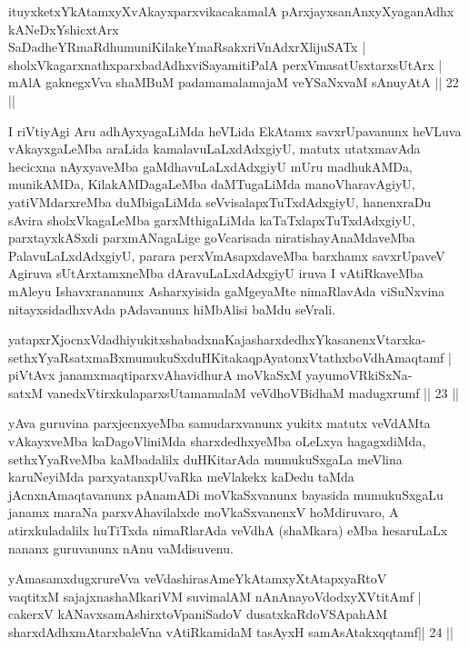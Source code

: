 \begin{shl}
ituyxketxYkAtamxyXvAkayxparxvikacakamalA pArxjayxsanAnxyXyaganAdhx \\
kANeDxYshicxtArx SaDadheYRmaRdhumuniKilakeYmaRsakxriVnAdxrXlijuSATx | \\
sholxVkagarxnathxparxbadAdhx\s viSayamitiPalA perxVmasatUsxtarxsUtArx | \\
mAlA gaknegxVva shaMBuM padamamalamajaM veYSaNxvaM sA\s nuyAtA \hfill||  22 ||  
\end{shl}

\begin{artha}
I riVtiyAgi Aru adhAyxyagaLiMda heVLida EkAtamx savxrUpavanunx heVLuva 
vAkayxgaLeMba araLida kamalavuLaLxdAdxgiyU, matutx utatxmavAda 
hecicxna nAyxyaveMba gaMdhavuLaLxdAdxgiyU mUru madhukAMDa, munikAMDa, 
KilakAMDagaLeMba daMTugaLiMda manoVharavAgiyU, yatiVMdarxreMba 
duMbigaLiMda seVvisalapxTuTxdAdxgiyU, hanenxraDu sAvira 
sholxVkagaLeMba garxMthigaLiMda kaTaTxlapxTuTxdAdxgiyU, parxtayxkASxdi 
parxmANagaLige goVcarisada niratishayAnaMdaveMba PalavuLaLxdAdxgiyU, 
parara perxVmAsapxdaveMba barxhamx savxrUpaveV Agiruva sUtArxtamxneMba 
dAravuLaLxdAdxgiyU iruva I vAtiRkaveMba mAleyu Ishavxrananunx 
Asharxyisida gaMgeyaMte nimaRlavAda viSuNxvina nitayxsidadhxvAda 
pAdavanunx hiMbAlisi baMdu seVrali.
\end{artha}

\begin{shl}
yatapxrXjocnxVdadhiyukitxshabadxnaKajasharxdedhxYkasanenxVtarxka-\\
sethxYyaRsatxmaBxmumukuSxduHKitakaqpAyatonxVtathxboVdhAmaqtamf | \\
piVtAvx janamxmaqtiparxvAhavidhurA moVkaSxM yayumoVRkiSxNa-\\
satxM vanedxV\s tirxkulaparxsUtamamalaM veVdhoVBidhaM madugxrumf \hfill||  23 ||  
\end{shl}

\begin{artha}
yAva guruvina parxjecnxyeMba samudarxvanunx yukitx matutx veVdAMta 
vAkayxveMba kaDagoVliniMda sharxdedhxyeMba oLeLxya hagagxdiMda, 
sethxYyaRveMba kaMbadalilx duHKitarAda mumukuSxgaLa meVlina 
karuNeyiMda parxyatanxpUvaRka meVlakekx kaDedu taMda 
jAcnxnAmaqtavanunx pAnamADi moVkaSxvanunx bayasida mumukuSxgaLu janamx 
maraNa parxvAhavilalxde moVkaSxvanenxV hoMdiruvaro, A atirxkuladalilx 
huTiTxda nimaRlarAda veVdhA (shaMkara) eMba hesaruLaLx nananx 
guruvanunx nAnu vaMdisuvenu.
\end{artha}

\begin{shl}
yAmasamxdugxrureVva veVdashirasAmeYkAtamxyXtAtapxyaRtoV \\
vaqtitxM sajajxnashaMkariVM suvimalAM nAnAnayoVdodxyXVtitAmf | \\
cakerxV kANavxsamAshirxtoVpaniSadoV dusatxkaRdoVSApahAM \\
sharxdAdhxmAtarxbaleVna vAtiRkamidaM tasAyxH samAsAtakxqqtamf\hfill ||  24 ||  
\end{shl}

